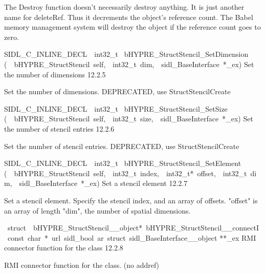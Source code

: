 \documentclass{article}
\begin{document}
\begin{cxxentry}
\begin{cxxentry}
\begin{cxxfunction}
\begin{cxxdoc}
The Destroy function doesn't necessarily destroy anything.
It is just another name for deleteRef.  Thus it decrements the
object's reference count.  The Babel memory management system will
destroy the object if the reference count goes to zero.
\end{cxxdoc}
\end{cxxfunction}
\begin{cxxfunction}
{SIDL\_C\_INLINE\_DECL\ \ int32\_t\ }
        {bHYPRE\_StructStencil\_SetDimension}
        {(\ \ bHYPRE\_StructStencil\ self,\ \ int32\_t\ dim,\ \ sidl\_BaseInterface\ *\_ex)}
        {
Set the number of dimensions}
        {12.2.5}
\begin{cxxdoc}

Set the number of dimensions.  DEPRECATED, use StructStencilCreate 
\end{cxxdoc}
\end{cxxfunction}
\begin{cxxfunction}
{SIDL\_C\_INLINE\_DECL\ \ int32\_t\ }
        {bHYPRE\_StructStencil\_SetSize}
        {(\ \ bHYPRE\_StructStencil\ self,\ \ int32\_t\ size,\ \ sidl\_BaseInterface\ *\_ex)}
        {
Set the number of stencil entries}
        {12.2.6}
\begin{cxxdoc}

Set the number of stencil entries.
DEPRECATED, use StructStencilCreate 
\end{cxxdoc}
\end{cxxfunction}
\begin{cxxfunction}
{SIDL\_C\_INLINE\_DECL\ \ int32\_t\ }
        {bHYPRE\_StructStencil\_SetElement}
        {(\ \ bHYPRE\_StructStencil\ self,\ \ int32\_t\ index,\ \ int32\_t*\ offset,\ \ int32\_t\ dim,\ \ sidl\_BaseInterface\ *\_ex)}
        {
Set a stencil element}
        {12.2.7}
\begin{cxxdoc}

Set a stencil element.  Specify the stencil index, and an array of
offsets.  "offset" is an array of length "dim", the number of spatial
dimensions. 
\end{cxxdoc}
\end{cxxfunction}
\begin{cxxvariable}
{\ struct\ \ bHYPRE\_StructStencil\_\_object*\ bHYPRE\_StructStencil\_\_connectI\ const\ char\ *\ url\ sidl\_bool\ ar\ struct\ sidl\_BaseInterface\_\_object}
        {**\_ex}
        {}
        {
RMI connector function for the class}
        {12.2.8}
\begin{cxxdoc}

RMI connector function for the class. (no addref)
\end{cxxdoc}
\end{cxxvariable}
\end{cxxentry}
\end{cxxentry}
\end{document}

